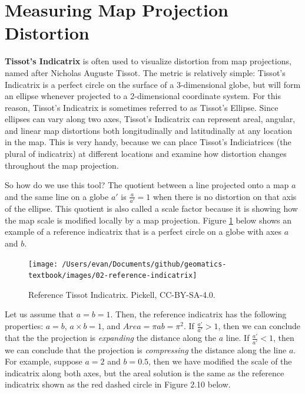 \documentclass[
]{book}
\begin{document}
\hypertarget{measuring-map-projection-distortion}{%
\section{Measuring Map Projection Distortion}\label{measuring-map-projection-distortion}}

\textbf{Tissot's Indicatrix} is often used to visualize distortion from map projections, named after Nicholas Auguste Tissot. The metric is relatively simple: Tissot's Indicatrix is a perfect circle on the surface of a 3-dimensional globe, but will form an ellipse whenever projected to a 2-dimensional coordinate system. For this reason, Tissot's Indicatrix is sometimes referred to as Tissot's Ellipse. Since ellipses can vary along two axes, Tissot's Indicatrix can represent areal, angular, and linear map distortions both longitudinally and latitudinally at any location in the map. This is very handy, because we can place Tissot's Indiciatrices (the plural of indicatrix) at different locations and examine how distortion changes throughout the map projection.

So how do we use this tool? The quotient between a line projected onto a map \(a\) and the same line on a globe \(a'\) is \(\frac{a}{a'}=1\) when there is no distortion on that axis of the ellipse. This quotient is also called a scale factor because it is showing how the map scale is modified locally by a map projection. Figure \ref{fig:2-reference-indicatrix} below shows an example of a reference indicatrix that is a perfect circle on a globe with axes \(a\) and \(b\).

\begin{figure}
\texttt{[image: /Users/evan/Documents/github/geomatics-textbook/images/02-reference-indicatrix]} \caption{Reference Tissot Indicatrix. Pickell, CC-BY-SA-4.0.}\label{fig:2-reference-indicatrix}
\end{figure}

Let us assume that \(a = b = 1\). Then, the reference indicatrix has the following properties: \(a=b\), \(a×b=1\), and \(Area=πab=π^2\). If \(\frac{a'}{a'}>1\), then we can conclude that the the projection is \emph{expanding} the distance along the \(a\) line. If \(\frac{a'}{a'}<1\), then we can conclude that the projection is \emph{compressing} the distance along the line \(a\). For example, suppose \(a=2\) and \(b=0.5\), then we have modified the scale of the indicatrix along both axes, but the areal solution is the same as the reference indicatrix shown as the red dashed circle in Figure 2.10 below.
\end{document}

